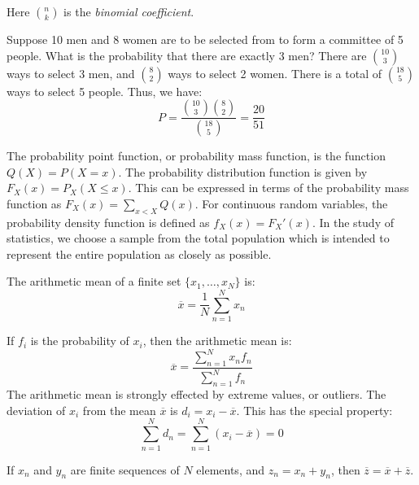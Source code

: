 \documentclass[crop=false,class=article,oneside]{standalone}
\begin{document}
        Here $\binom{n}{k}$ is the \textit{binomial coefficient}.
        \begin{example}
            Suppose 10 men and 8 women are to be selected from to form
            a committee of 5 people. What is the probability that there
            are exactly 3 men? There are $\binom{10}{3}$ ways to
            select 3 men, and $\binom{8}{2}$ ways to select 2 women.
            There is a total of $\binom{18}{5}$ ways to select 5 people.
            Thus, we have:
            \begin{equation*}
                P=\frac{\binom{10}{3}\binom{8}{2}}{\binom{18}{5}}
                =\frac{20}{51}
            \end{equation*}
        \end{example}
        The probability point function, or probability mass function,
        is the function $Q(X)=P(X=x)$. The probability distribution
        function is given by
        $F_{X}(x)=P_{X}(X\leq{x})$. This can be expressed in
        terms of the probability mass function as
        $F_{X}(x)=\sum_{x<X}Q(x)$. For continuous random variables,
        the probability density function is defined as
        $f_{X}(x)=F_{X}'(x)$. In the study of statistics, we choose a sample
        from the total population which is intended to represent the
        entire population as closely as possible.
        \begin{definition}
            The arithmetic mean of a finite set
            $\{x_{1},\hdots,x_{N}\}$ is:
            \begin{equation*}
                \overline{x}=\frac{1}{N}\sum_{n=1}^{N}x_{n}
            \end{equation*}
        \end{definition}
        If $f_{i}$ is the probability of $x_{i}$, then the arithmetic mean is:
        \begin{equation*}
            \overline{x}=
            \frac{\sum_{n=1}^{N}x_{n}f_{n}}{\sum_{n=1}^{N}f_{n}}
        \end{equation*}
        The arithmetic mean is strongly effected by extreme values, or outliers.
        The deviation of $x_{i}$ from the mean $\overline{x}$
        is $d_{i}=x_{i}-\overline{x}$. This has the special property:
        \begin{equation*}
            \sum_{n=1}^{N}d_{n}
            =\sum_{n=1}^{N}(x_{i}-\overline{x})
            =0
        \end{equation*}
        \begin{theorem}
            If $x_{n}$ and $y_{n}$ are finite sequences of
            $N$ elements, and $z_{n}=x_{n}+y_{n}$, then
            $\overline{z}=\overline{x}+\overline{z}$.
        \end{theorem}
\end{document}
